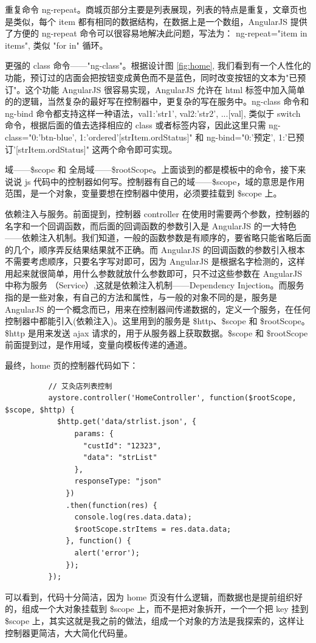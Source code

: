         重复命令 ng-repeat。商城页部分主要是列表展现，列表的特点是重复，文章页也是类似，每个 item 都有相同的数据结构，在数据上是一个数组，AngularJS 提供了方便的 ng-repeat 命令可以很容易地解决此问题，写法为：
        ng-repeat="item in items", 类似 "for in" 循环。
        \par
        更强的 class 命令——"ng-class"。根据设计图 \ref{fig:home}, 我们看到有一个人性化的功能，预订过的店面会把按钮变成黄色而不是蓝色，同时改变按钮的文本为"已预订"。这个功能 AngularJS 很容易实现，AngularJS 允许在 html 标签中加入简单的的逻辑，当然复杂的最好写在控制器中，更复杂的写在服务中。ng-class 命令和 ng-bind 命令都支持这样一种语法，{val1:'str1', val2:'str2', ...}[val], 类似于 switch 命令，根据后面的值去选择相应的 class 或者标签内容，因此这里只需 ng-class="{0:'btn-blue', 1:'ordered'}[strItem.ordStatus]" 和 ng-bind="{0:'预定', 1:'已预订'}[strItem.ordStatus]" 这两个命令即可实现。
        \par
        域——\$scope 和 全局域——\$rootScope。上面谈到的都是模板中的命令，接下来说说 js 代码中的控制器如何写。控制器有自己的域——\$scope，域的意思是作用范围，是一个对象，变量要想在控制器中使用，必须要挂载到 \$scope 上。
        \par
        依赖注入与服务。前面提到，控制器 controller 在使用时需要两个参数，控制器的名字和一个回调函数，而后面的回调函数的参数引入是 AngularJS 的一大特色——依赖注入机制。我们知道，一般的函数参数是有顺序的，要省略只能省略后面的几个，顺序弄反结果结果就不正确。而 AngularJS 的回调函数的参数引入根本不需要考虑顺序，只要名字写对即可，因为 AngularJS 是根据名字检测的，这样用起来就很简单，用什么参数就放什么参数即可，只不过这些参数在 AngularJS 中称为服务 （Service）,这就是依赖注入机制——Dependency Injection。而服务指的是一些对象，有自己的方法和属性，与一般的对象不同的是，服务是 AngularJS 的一个概念而已，用来在控制器间传递数据的，定义一个服务，在任何控制器中都能引入(依赖注入)。这里用到的服务是 \$http、\$scope 和 \$rootScope。\$http 是用来发送 ajax 请求的，用于从服务器上获取数据。\$scope 和 \$rootScope 前面提到过，是作用域，变量向模板传递的通道。
        \par
        最终，home 页的控制器代码如下：
        \begin{lstlisting}
          // 艾灸店列表控制
          aystore.controller('HomeController', function($rootScope, $scope, $http) {
            $http.get('data/strlist.json', {
                params: {
                  "custId": "12323",
                  "data": "strList"
                },
                responseType: "json"
              })
              .then(function(res) {
                console.log(res.data.data);
                $rootScope.strItems = res.data.data;
              }, function() {
                alert('error');
              });
          });
        \end{lstlisting}
        可以看到，代码十分简洁，因为 home 页没有什么逻辑，而数据也是提前组织好的，组成一个大对象挂载到 \$scope 上，而不是把对象拆开，一个一个把 key 挂到 \$scope 上，其实这就是我之前的做法，组成一个对象的方法是我探索的，这样让控制器更简洁，大大简化代码量。

